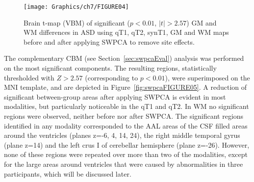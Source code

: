 \begin{figure}
	\centering
	\texttt{[image: Graphics/ch7/FIGURE04]}
	\caption[Brain t-map (\acs{VBM}) of significant ($p<0.01$, $|t|>2.57$) \acs{GM} and \acs{WM} differences in \acs{ASD} using \acs{qT1}, \acs{qT2}, \acs{synT1}, \acs{GM} and \acs{WM} maps before and after applying \acs{SWPCA} to remove site effects.]{Brain t-map (\ac{VBM}) of significant ($p<0.01$, $|t|>2.57$) \ac{GM} and \ac{WM} differences in \ac{ASD} using \ac{qT1}, \ac{qT2}, \ac{synT1}, \ac{GM} and \ac{WM} maps before and after applying \ac{SWPCA} to remove site effects.}
	\label{fig:swpcaFIGURE04}
\end{figure}

The complementary \ac{CBM} (see Section~\ref{sec:swpcaEval}) analysis was performed on the most significant components. The resulting regions, statistically thresholded with $Z>2.57$ (corresponding to $p<0.01$), were superimposed on the \ac{MNI} template, and are depicted in Figure~\ref{fig:swpcaFIGURE05}. A reduction of significant between-group areas after applying \ac{SWPCA} is evident in most modalities, but particularly noticeable in the \ac{qT1} and \ac{qT2}. In \ac{WM} no significant regions were observed, neither before nor after \ac{SWPCA}. The significant regions identified in any modality corresponded to the \ac{AAL} areas of the \ac{CSF} filled areas around the ventricles (planes z=-6, 4, 14, 24), the right middle temporal gyrus (plane z=14) and the left crus I of cerebellar hemisphere (plane z=-26). However, none of these regions were repeated over more than two of the modalities, except for the large areas around ventricles that were caused by abnormalities in three participants, which will be discussed later.

